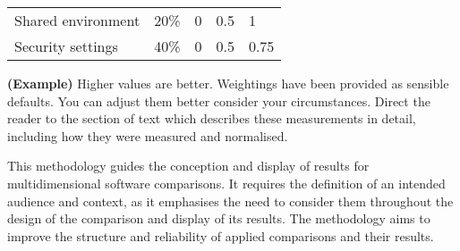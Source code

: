 \begin{table}[ht]
{\begin{threeparttable}
\begin{tabular}{l r | l l l}
        Shared environment    & 20\%            & 0                                    & 0.5                                 & 1                                     \\ 
        Security settings     & 40\%            & 0                                    & 0.5                                 & 0.75                                  \\ 
        \bottomrule
      \end{tabular}
      \begin{tablenotes}
        \item \textbf{(Example)} Higher values are better. Weightings have been provided as sensible defaults. You can adjust them better consider your circumstances.
        \source Direct the reader to the section of text which describes these measurements in detail, including how they were measured and normalised.
      \end{tablenotes}
    \end{threeparttable}}
  \end{table}
  
  This methodology guides the conception and display of results for multidimensional software comparisons. It requires the definition of an intended audience and context, as it emphasises the need to consider them throughout the design of the comparison and display of its results. The methodology aims to improve the structure and reliability of applied comparisons and their results.

